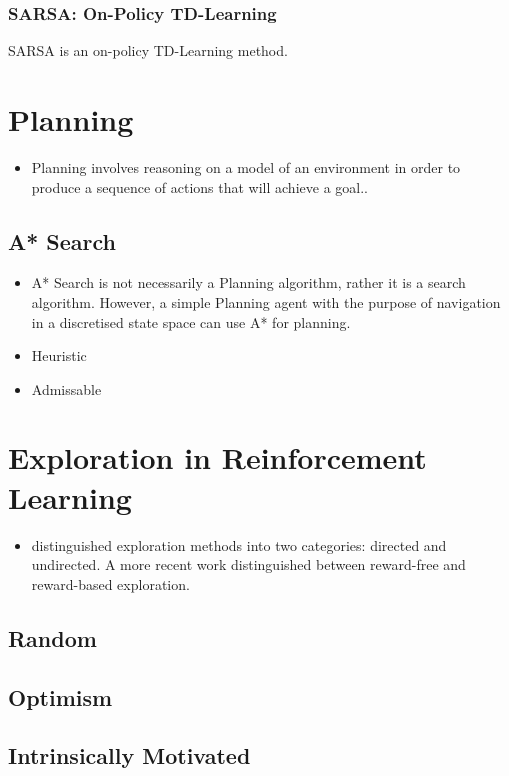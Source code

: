 \subsubsection{SARSA: On-Policy TD-Learning}
    \item SARSA is an on-policy TD-Learning method.
\section{Planning}
\begin{itemize}
    \item Planning involves reasoning on a model of an environment in order to produce a sequence of actions that will achieve a goal.\cite{russelNorvig2003:aima}.
\end{itemize}
\subsection{A* Search}
\begin{itemize}
    \item A* Search \cite{4082128} is not necessarily a Planning algorithm, rather it is a search algorithm. However, a simple Planning agent with the purpose of navigation in a discretised state space can use A* for planning.
    \item Heuristic
    \item Admissable
\end{itemize}
\section{Exploration in Reinforcement Learning}
\begin{itemize}
    \item \cite{Thrun-1992-15850} distinguished exploration methods into two categories: directed and undirected. A more recent work \cite{DBLP:journals/corr/abs-2109-00157} distinguished between reward-free and reward-based exploration.
\end{itemize}
\subsection{Random}
\subsection{Optimism}
\subsection{Intrinsically Motivated}
